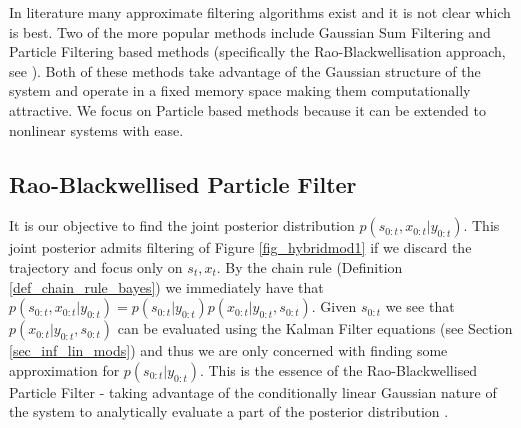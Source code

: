 In literature many approximate filtering algorithms exist and it is not clear which is best. Two of the more popular methods include Gaussian Sum Filtering \cite{barber2} and Particle Filtering based methods (specifically the Rao-Blackwellisation approach, see \cite{chen}\cite{doucet}). Both of these methods take advantage of the Gaussian structure of the system and operate in a fixed memory space making them computationally attractive. We focus on Particle based methods because it can be extended to nonlinear systems with ease.   

\subsection{Rao-Blackwellised Particle Filter}
It is our objective to find the joint posterior distribution $p(s_{0:t}, x_{0:t}|y_{0:t})$. This joint posterior admits filtering of Figure \ref{fig_hybridmod1} if we discard the trajectory and focus only on $s_t,x_t$. By the chain rule (Definition \ref{def_chain_rule_bayes}) we immediately have that $p(s_{0:t}, x_{0:t}|y_{0:t}) = p(s_{0:t}|y_{0:t})p(x_{0:t}|y_{0:t}, s_{0:t})$. Given $s_{0:t}$ we see that $p(x_{0:t}|y_{0:t}, s_{0:t})$ can be evaluated using the Kalman Filter equations (see Section \ref{sec_inf_lin_mods}) and thus we are only concerned with finding some approximation for $p(s_{0:t}|y_{0:t})$. This is the essence of the Rao-Blackwellised Particle Filter - taking advantage of the conditionally linear Gaussian nature of the system to analytically evaluate a part of the posterior distribution \cite{doucet}.

